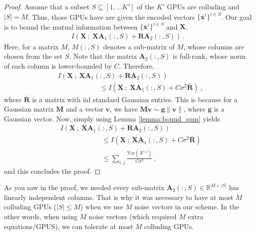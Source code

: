 \begin{proof}
Assume that a subset $S\subseteq [1,\dots K']$ of the $K'$ GPUs are colluding and $|S|=M$. Thus, those GPUs have are given the encoded vectors $\{\bar{\mathbf x}^i\}^{i\in S}$. Our goal is to bound the mutual information between $\{\bar{\mathbf x}^i\}^{i\in S}$ and $\mathbf X$.
\begin{align}
    I\left({\mathbf X}~;~ \mathbf X\mathbf A_1(:,S)+\mathbf R\mathbf A_2(:,S)\right)~.
\end{align}
Here, for a matrix $M$, $M(:,S)$ denotes a sub-matrix of $M$, whose columns are chosen from the set $S$. Note that the matrix $\mathbf A_2(:,S)$ is full-rank, whose norm of each column is lower-bounded by $C$. Therefore, 
\begin{align}
    &I\left({\mathbf X}~;~ \mathbf X\mathbf A_1(:,S)+\mathbf R\mathbf A_2(:,S)\right)\nonumber\\
    &\qquad\qquad\qquad \leq I\left({\mathbf X}~;~ \mathbf X\mathbf A_1(:,S)+C\sigma^2\bar{\mathbf R}\right)~,
\end{align}
where $\bar{\mathbf R}$ is a matrix with iid standard Gaussian entries. This is because for a Gaussian matrix $\mathbf M$ and a vector $\mathbf v$, we have $\mathbf M\mathbf v\sim \mathbf g \|\mathbf v\|$, where $\mathbf g$ is a Gaussian vector. Now, simply using Lemma \ref{lemma:bound_sum} yields
\begin{align}
    &I\left({\mathbf X}~;~ \mathbf X\mathbf A_1(:,S)+\mathbf R\mathbf A_2(:,S)\right)\nonumber\\
    &\qquad\qquad\qquad \leq I\left({\mathbf X}~;~ \mathbf X\mathbf A_1(:,S)+C\sigma^2\bar{\mathbf R}\right)\nonumber\\
    &\qquad\qquad\qquad  \leq\sum_{i,j} \frac{\text{Var}(X^{i,j})}{C\sigma^2}~,
\end{align}
and this concludes the proof.
\end{proof}
As you saw in the proof, we needed every sub-matrix $\mathbf A_2(:,S)\in\mathbb R^{M\times |S|}$ has linearly independent columns. That is why it was necessary to have at most $M$ colluding GPUs ($|S|\leq M$) when we use $M$ noise vectors in our scheme. In the other words, when using $M$ noise vectors (which required $M$ extra equations/GPUS), we can tolerate at most $M$ colluding GPUs.

